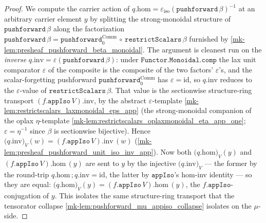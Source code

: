 \begin{proof}
  \leanok
  We compute the carrier action of \(q.\mathrm{hom} = \varepsilon_{\mathrm{iso}}(\mathtt{pushforward}\,
  \beta)^{-1}\) at an arbitrary carrier element \(y\) by splitting the strong-monoidal structure of
  \(\mathtt{pushforward}\,\beta\) along the factorization
  \(\mathtt{pushforward}\,\beta = \mathtt{pushforward}_0^{\mathrm{Comm}} \,\circ\,
  \mathtt{restrictScalars}\,\beta\) furnished by
  \ref{mk-lem:presheaf_pushforward_beta_monoidal}. The argument is cleanest run on the \emph{inverse}
  \(q.\mathrm{inv} = \varepsilon(\mathtt{pushforward}\,\beta)\): under \(\mathtt{Functor.Monoidal.comp}\)
  the lax unit comparator \(\varepsilon\) of the composite is the composite of the two factors'
  \(\varepsilon\)'s, and the scalar-forgetting pushforward \(\mathtt{pushforward}_0^{\mathrm{Comm}}\)
  has \(\varepsilon = \mathrm{id}\), so \(q.\mathrm{inv}\) reduces to the \(\varepsilon\)-value of
  \(\mathtt{restrictScalars}\,\beta\). That value is the sectionwise structure-ring transport
  \((f.\mathtt{appIso}\,V).\mathrm{inv}\), by the abstract \(\varepsilon\)-template
  \ref{mk-lem:restrictscalars_laxmonoidal_eps_app} (the strong-monoidal companion of the oplax
  \(\eta\)-template \ref{mk-lem:restrictscalars_oplaxmonoidal_eta_app_one}; \(\varepsilon = \eta^{-1}\)
  since \(\beta\) is sectionwise bijective). Hence
  \(\bigl(q.\mathrm{inv}\bigr)_V (w) = (f.\mathtt{appIso}\,V).\mathrm{inv}\,(w)\)
  (\ref{mk-lem:presheaf_pushforward_unit_iso_inv_app}). Now both \(\bigl(q.\mathrm{hom}\bigr)_V(y)\) and
  \((f.\mathtt{appIso}\,V).\mathrm{hom}\,(y)\) are sent to \(y\) by the injective
  \(\bigl(q.\mathrm{inv}\bigr)_V\) — the former by the round-trip \(q.\mathrm{hom}\,;q.\mathrm{inv} =
  \mathrm{id}\), the latter by \(\mathtt{appIso}\)'s hom-inv identity — so they are equal:
  \(\bigl(q.\mathrm{hom}\bigr)_V (y) = (f.\mathtt{appIso}\,V).\mathrm{hom}\,(y)\), the
  \(f.\mathtt{appIso}\)-conjugation of \(y\). This isolates the same structure-ring transport that the
  tensorator collapse \ref{mk-lem:pushforward_mu_appiso_collapse} isolates on the \(\mu\)-side.
\end{proof}

